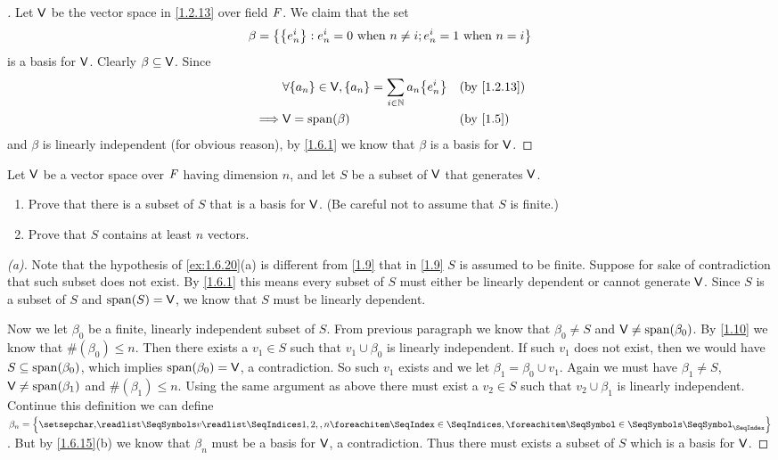 \begin{proof}[]
  Let \(\mathsf{V}\) be the vector space in \cref{1.2.13} over field \(\mathit{F}\).
  We claim that the set
  \[
    \beta = \left\lbrace\left\lbrace e_n^i\right\rbrace : e_n^i = 0 \text{ when } n \neq i ; e_n^i = 1 \text{ when } n = i\right\rbrace
  \]
  is a basis for \(\mathsf{V}\).
  Clearly \(\beta \subseteq \mathsf{V}\).
  Since
  \begin{align*}
             & \forall \set{a_n} \in \V, \set{a_n} = \sum_{i \in \N} a_n \set{e_n^i} &  & \text{(by \cref{1.2.13})} \\
    \implies & \V = \spn{\beta}                                                      &  & \text{(by \cref{1.5})}
  \end{align*}
  and \(\beta\) is linearly independent (for obvious reason), by \cref{1.6.1} we know that \(\beta\) is a basis for \(\mathsf{V}\).
\end{proof}

\setcounter{ex}{19}
\begin{ex}\label{ex:1.6.20}
  Let \(\mathsf{V}\) be a vector space over \(\mathit{F}\) having dimension \(n\), and let \(S\) be a subset of \(\mathsf{V}\) that generates \(\mathsf{V}\).
  \begin{enumerate}
    \item Prove that there is a subset of \(S\) that is a basis for \(\mathsf{V}\).
          (Be careful not to assume that \(S\) is finite.)
    \item Prove that \(S\) contains at least \(n\) vectors.
  \end{enumerate}
\end{ex}

\begin{proof}[(a)]
  Note that the hypothesis of \cref{ex:1.6.20}(a) is different from \cref{1.9} that in \cref{1.9} \(S\) is assumed to be finite.
  Suppose for sake of contradiction that such subset does not exist.
  By \cref{1.6.1} this means every subset of \(S\) must either be linearly dependent or cannot generate \(\mathsf{V}\).
  Since \(S\) is a subset of \(S\) and \(\spn{S} = \V\), we know that \(S\) must be linearly dependent.

  Now we let \(\beta_0\) be a finite, linearly independent subset of \(S\).
  From previous paragraph we know that \(\beta_0 \neq S\) and \(\V \neq \spn{\beta_0}\).
  By \cref{1.10} we know that \(\#(\beta_0) \leq n\).
  Then there exists a \(v_1 \in S\) such that \(v_1 \cup \beta_0\) is linearly independent.
  If such \(v_1\) does not exist, then we would have \(S \subseteq \spn{\beta_0}\), which implies \(\spn{\beta_0} = \V\), a contradiction.
  So such \(v_1\) exists and we let \(\beta_1 = \beta_0 \cup v_1\).
  Again we must have \(\beta_1 \neq S\), \(\V \neq \spn{\beta_1}\) and \(\#(\beta_1) \leq n\).
  Using the same argument as above there must exist a \(v_2 \in S\) such that \(v_2 \cup \beta_1\) is linearly independent.
  Continue this definition we can define \(\beta_n = \set{\seq{v}{1,2,,n}}\).
  But by \cref{1.6.15}(b) we know that \(\beta_n\) must be a basis for \(\mathsf{V}\), a contradiction.
  Thus there must exists a subset of \(S\) which is a basis for \(\mathsf{V}\).
\end{proof}

